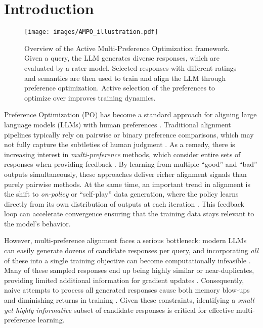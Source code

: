 \vspace{-0.15in}
\section{Introduction}


\begin{figure}[!thbp]
    \centering
    \texttt{[image: images/AMPO\_illustration.pdf]}
    \vspace{-0.15in}
    \caption{Overview of the Active Multi-Preference Optimization framework. Given a query, the LLM generates diverse responses, which are evaluated by a rater model. Selected responses with different ratings and semantics are then used to train and align the LLM through preference optimization. Active selection of the preferences to optimize over improves training dynamics.}
\label{fig:ampo_illustration}
\end{figure}

\vspace{-0.05in}
Preference Optimization (PO) has become a standard approach for aligning large language models (LLMs) with human preferences \citep{christiano2017deep, ouyang2022training, bai2022training}. Traditional alignment pipelines typically rely on pairwise or binary preference comparisons, which may not fully capture the subtleties of human judgment \citep{rafailov2024direct, liu2024tis, korbak2023pretraining}. As a remedy, there is increasing interest in \emph{multi-preference} methods, which consider entire sets of responses when providing feedback \citep{cui2023ultrafeedback, chen2024noise, gupta2024swepo}. By learning from multiple “good” and “bad” outputs simultaneously, these approaches deliver richer alignment signals than purely pairwise methods. At the same time, an important trend in alignment is the shift to \emph{on-policy} or “self-play” data generation, where the policy learns directly from its own distribution of outputs at each iteration \citep{chen2024self, kumar2024training, wu2023fine, wu2024self}. This feedback loop can accelerate convergence ensuring that the training data stays relevant to the model’s behavior.


\vspace{-0.05in}
However, multi-preference alignment faces a serious bottleneck: modern LLMs can easily generate dozens of candidate responses per query, and incorporating \emph{all} of these into a single training objective can become computationally infeasible \citep{askell2021general}. Many of these sampled responses end up being highly similar or near-duplicates, providing limited additional information for gradient updates \citep{long2024llms}. Consequently, naive attempts to process all generated responses cause both memory blow-ups and diminishing returns in training \citep{dubey2024llama}. Given these constraints, identifying a \emph{small yet highly informative} subset of candidate responses is critical for effective multi-preference learning.




